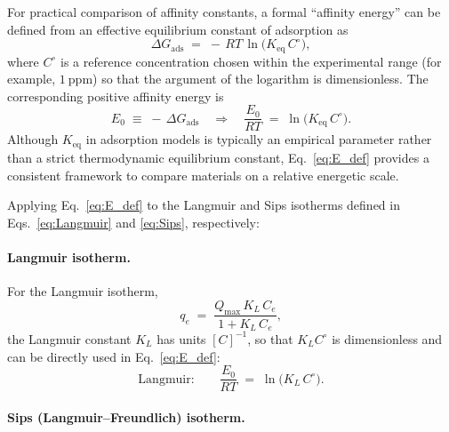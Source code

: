 	For practical comparison of affinity constants, a formal ``affinity energy'' can be defined from an effective equilibrium constant of adsorption as
	\begin{equation}
		\Delta G_{\mathrm{ads}} \;=\; -\,RT\,\ln\!\big(K_{\mathrm{eq}}\,C^\circ\big),
	\end{equation}
	where \(C^\circ\) is a reference concentration chosen within the experimental range (for example, \(1~\mathrm{ppm}\)) so that the argument of the logarithm is dimensionless. The corresponding positive affinity energy is
	\begin{equation}
		E_0 \;\equiv\; -\,\Delta G_{\mathrm{ads}}
		\quad\Rightarrow\quad
		\frac{E_0}{RT} \;=\; \ln\!\big(K_{\mathrm{eq}}\,C^\circ\big).
		\label{eq:E_def}
	\end{equation}
	Although \(K_{\mathrm{eq}}\) in adsorption models is typically an empirical parameter rather than a strict thermodynamic equilibrium constant, Eq.~\eqref{eq:E_def} provides a consistent framework to compare materials on a relative energetic scale.
	
	Applying Eq.~\eqref{eq:E_def} to the Langmuir and Sips isotherms defined in Eqs.~\eqref{eq:Langmuir} and \eqref{eq:Sips}, respectively:
	
	\paragraph{Langmuir isotherm.}
	
	For the Langmuir isotherm,
	\begin{equation}
		q_e \;=\; \frac{Q_{\max}\,K_L\,C_e}{1 + K_L\,C_e},
	\end{equation}
	the Langmuir constant \(K_L\) has units \([C]^{-1}\), so that \(K_L C^\circ\) is dimensionless and can be directly used in Eq.~\eqref{eq:E_def}:
	\begin{equation}
		\text{Langmuir:}\qquad
		\frac{E_0}{RT} \;=\; \ln\!\big(K_L\,C^\circ\big).
		\label{eq:E_langmuir}
	\end{equation}
	
	\paragraph{Sips (Langmuir--Freundlich) isotherm.}
	
